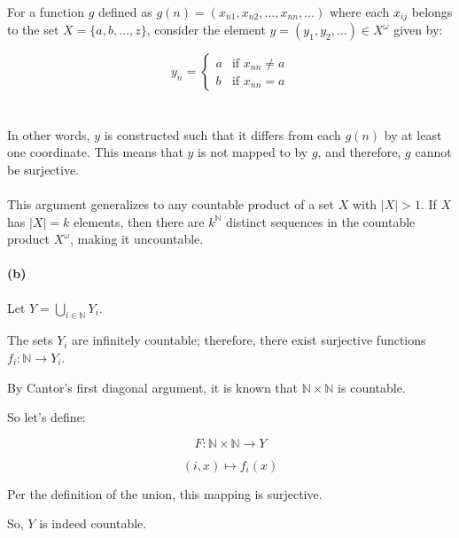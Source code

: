 \documentclass[12pt]{article}
\begin{document}
For a function \(g\) defined as \(g(n) = (x_{n1}, x_{n2}, \ldots, x_{nn}, \ldots)\) where each \(x_{ij}\) belongs to the set \(X = \{a, b, \ldots, z\}\), consider the element \(y = (y_1, y_2, \ldots) \in X^\omega\) given by:

\[
y_n = 
\begin{cases}
    a & \text{if } x_{nn} \neq a \\
    b & \text{if } x_{nn} = a
\end{cases}
\]
\\ \\
In other words, \(y\) is constructed such that it differs from each \(g(n)\) by at least one coordinate. This means that \(y\) is not mapped to by \(g\), and therefore, \(g\) cannot be surjective.
\\ \\
This argument generalizes to any countable product of a set \(X\) with \(\lvert X \rvert > 1\). If \(X\) has \(\lvert X \rvert = k\) elements, then there are \(k^{\mathbb{N}}\) distinct sequences in the countable product \(X^\omega\), making it uncountable.



\paragraph{(b)}
Let \(Y = \bigcup_{i \in \mathbb{N}} Y_i\).

The sets \(Y_i\) are infinitely countable; therefore, there exist surjective functions \(f_i: \mathbb{N} \rightarrow Y_i\).

By Cantor's first diagonal argument, it is known that \(\mathbb{N} \times \mathbb{N}\) is countable.

So let's define:

\[ F: \mathbb{N} \times \mathbb{N} \rightarrow Y \]

\[ (i, x) \mapsto f_i(x) \]

Per the definition of the union, this mapping is surjective.

So, \(Y\) is indeed countable.
\end{document}

